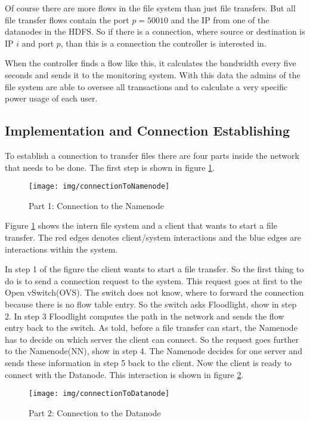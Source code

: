  Of course there are more flows in the file system than just file transfers. But all file transfer flows contain the port $p=50010$ and the IP from one of the datanodes in the HDFS. So if there is a connection, where source or destination is IP $i$ and port $p$, than this is a connection the controller is interested in.
 
 When the controller finds a flow like this, it calculates the bandwidth every five seconds and sends it to the monitoring system. With this data the admins of the file system are able to oversee all transactions and to calculate a very specific power usage of each user. 
 
 \subsection{Implementation and Connection Establishing}               

To establish a connection to transfer files there are four parts inside the network that needs to be done. The first step is shown in figure \ref{nn}.
 
\begin{figure}[ht]
\centering
\texttt{[image: img/connectionToNamenode]} 
\caption{Part 1: Connection to the Namenode}
\label{nn}
\end{figure}

Figure \ref{nn} shows the intern file system and a client that wants to start a file transfer. The red edges denotes client/system interactions and the blue edges are interactions within the system.

In step 1 of the figure the client wants to start a file transfer. So the first thing to do is to send a connection request to the system. This request goes at first to the Open vSwitch(OVS). The switch does not know, where to forward the connection because there is no flow table entry. So the switch asks Floodlight, show in step 2. In step 3 Floodlight computes the path in the network and sends the flow entry back to the switch. As told, before a file transfer can start, the Namenode has to decide on which server the client can connect. So the request goes further to the Namenode(NN), show in step 4. The Namenode decides for one server and sends these information in step 5 back to the client. Now the client is ready to connect with the Datanode. This interaction is shown in figure \ref{dn}.

\begin{figure}[ht]
\centering
\texttt{[image: img/connectionToDatanode]} 
\caption{Part 2: Connection to the Datanode}
\label{dn}
\end{figure}     

